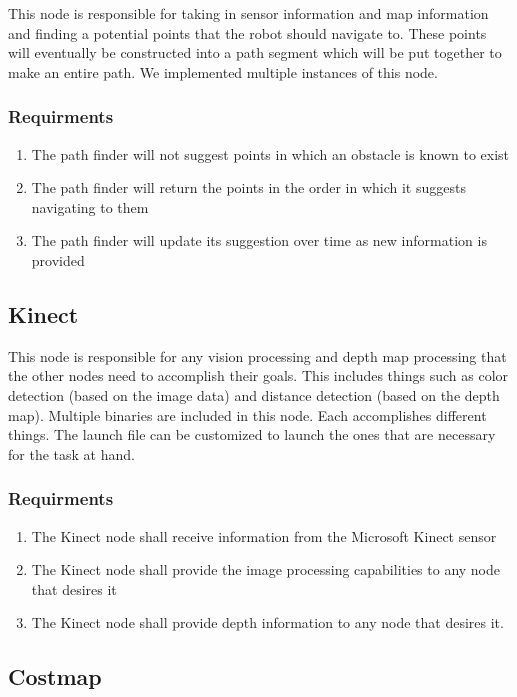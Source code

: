 This node is responsible for taking in sensor information and map information and finding a potential points that the robot should navigate to. These points will eventually be constructed into a path segment which will be put together to make an entire path. We implemented multiple instances of this node.

     \subsubsection{Requirments}
     \begin{enumerate}
       \item The path finder will not suggest points in which an obstacle is known to exist
       \item The path finder will return the points in the order in which it suggests navigating to
             them
       \item The path finder will update its suggestion over time as new information is provided
     \end{enumerate}
 
\subsection{Kinect}

This node is responsible for any vision processing and depth map processing that the other nodes need to accomplish their goals.  This includes things such as color detection (based on the image data) and distance detection (based on the depth map). Multiple binaries are included in this node. Each accomplishes different things. The launch file can be customized to launch the ones that are necessary for the task at hand.

  \subsubsection{Requirments}
  \begin{enumerate}
    \item The Kinect node shall receive information from the Microsoft Kinect sensor
    \item The Kinect node shall provide the image processing capabilities to any node that desires it
    \item The Kinect node shall provide depth information to any node that desires it.
  \end{enumerate}

\subsection{Costmap}


